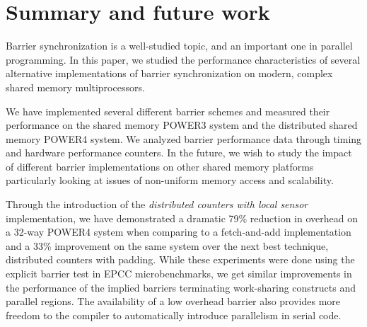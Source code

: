 
\section{Summary and future work}
\label{summary}

Barrier synchronization is a well-studied topic, and an important
one in parallel programming. In this paper, we studied the performance
characteristics of several alternative implementations of barrier
synchronization on modern, complex shared memory multiprocessors.

We have implemented several different barrier schemes and measured their performance on the shared memory POWER3 system and the distributed shared
memory POWER4 system. We analyzed barrier performance data through
timing and hardware performance counters. In the future, we wish to study
the impact of different barrier implementations on other shared memory
platforms particularly looking at issues of non-uniform memory access and
scalability.

Through the introduction of the \emph{distributed counters with local sensor}
implementation, we have demonstrated a dramatic 79\% reduction in overhead on a
32-way POWER4 system when comparing to a fetch-and-add implementation and a 33\%
improvement on the same system over the next best technique, distributed
counters with padding.  While these experiments were done using the explicit 
barrier test in EPCC microbenchmarks,
we get similar improvements in the performance of the implied barriers
terminating work-sharing constructs and parallel regions.  The availability of
a low overhead barrier also provides more freedom to the compiler to automatically
introduce parallelism in serial code.





